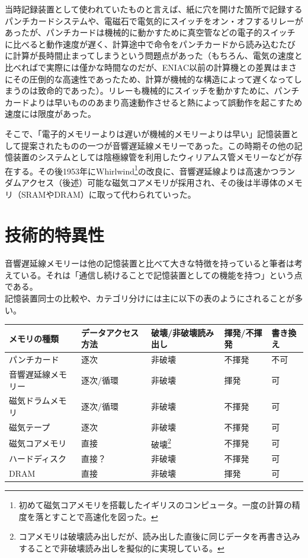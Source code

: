 \documentclass[a4paper,report]{jsbook}
\begin{document}
当時記録装置として使われていたものと言えば、紙に穴を開けた箇所で記録するパンチカードシステムや、電磁石で電気的にスイッチをオン・オフするリレーがあったが、パンチカードは機械的に動かすために真空管などの電子的スイッチに比べると動作速度が遅く、計算途中で命令をパンチカードから読み込むたびに計算が長時間止まってしまうという問題点があった（もちろん、電気の速度と比べればで実際には僅かな時間なのだが、ENIAC以前の計算機との差異はまさにその圧倒的な高速性であったため、計算が機械的な構造によって遅くなってしまうのは致命的であった）。リレーも機械的にスイッチを動かすために、パンチカードよりは早いもののあまり高速動作させると熱によって誤動作を起こすため速度には限度があった。

そこで、「電子的メモリーよりは遅いが機械的メモリーよりは早い」記憶装置として提案されたものの一つが音響遅延線メモリーであった。この時期その他の記憶装置のシステムとしては陰極線管を利用したウィリアムス管メモリーなどが存在する\autocite{invent_computer}。その後1953年にWhirlwind\footnote{初めて磁気コアメモリを搭載したイギリスのコンピュータ。一度の計算の精度を落とすことで高速化を図った。}の改良に、音響遅延線よりは高速かつランダムアクセス（後述）可能な磁気コアメモリが採用され、その後は半導体のメモリ（SRAMやDRAM）に取って代わられていった。

\section{技術的特異性}\label{ux6280ux8853ux7684ux7279ux7570ux6027}

音響遅延線メモリーは他の記憶装置と比べて大きな特徴を持っていると筆者は考えている。それは「通信し続けることで記憶装置としての機能を持つ」という点である。\\
記憶装置同士の比較や、カテゴリ分けには主に以下の表のようにされることが多い。

\begin{longtable}[]{@{}lllll@{}}
\toprule
メモリの種類 & データアクセス方法 & 破壊/非破壊読み出し & 揮発/不揮発 &
書き換え\tabularnewline
\midrule
\endhead
パンチカード & 逐次 & 非破壊 & 不揮発 & 不可\tabularnewline
音響遅延線メモリー & 逐次/循環 & 非破壊 & 揮発 & 可\tabularnewline
磁気ドラムメモリ & 逐次/循環 & 非破壊 & 不揮発 & 可\tabularnewline
磁気テープ & 逐次 & 非破壊 & 不揮発 & 可\tabularnewline
磁気コアメモリ & 直接 & 破壊\footnote{コアメモリは破壊読み出しだが、読み出した直後に同じデータを再書き込みすることで非破壊読み出しを擬似的に実現している。}
& 不揮発 & 可\tabularnewline
ハードディスク & 直接？ & 非破壊 & 不揮発 & 可\tabularnewline
DRAM & 直接 & 非破壊 & 揮発 & 可\tabularnewline
\bottomrule
\end{longtable}
\end{document}
